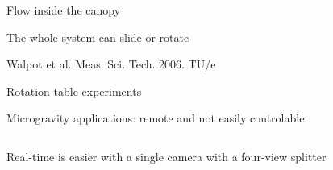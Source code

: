     
\begin{frame}[label=app-19]{Flow inside the canopy}
    \centering
\end{frame}
    

\begin{frame}[label=app-12]{The whole system can slide or rotate}
    \begin{cardTiny} 
        Walpot et al. Meas. Sci. Tech. 2006. TU/e
    \end{cardTiny}
\end{frame}
    

\begin{frame}[label=app-6]{Rotation table experiments}
\end{frame}
    
  
\begin{frame}[label=app-7]{Microgravity applications: remote and not easily controlable}   
    \begin{columns}
    \end{columns}
\end{frame}


\begin{frame}[label=app-11]{Real-time is easier with a single camera with a four-view splitter}
    \centering{}
\end{frame}

